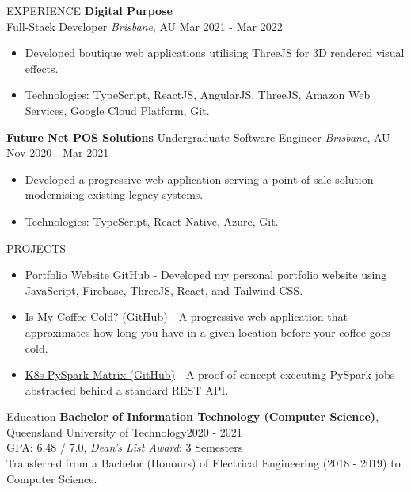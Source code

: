\documentclass{resume}
\begin{document}
\begin{rSection}{EXPERIENCE}
      \textbf{Digital Purpose}\\
      Full-Stack Developer \hfill \textit{Brisbane}, AU \textbar\space Mar 2021 - Mar 2022
      \begin{itemize}
         \item Developed boutique web applications utilising ThreeJS for 3D rendered visual effects.
         \item Technologies: TypeScript, ReactJS, AngularJS, ThreeJS, Amazon Web Services, Google Cloud Platform, Git.
      \end{itemize}
      
      \textbf{Future Net POS Solutions}
      Undergraduate Software Engineer \hfill \textit{Brisbane}, AU \textbar\space Nov 2020 - Mar 2021
      \begin{itemize}
         \item Developed a progressive web application serving a point-of-sale solution modernising existing legacy systems.
         \item Technologies: TypeScript, React-Native, Azure, Git.
      \end{itemize}
   \end{rSection} 

   \begin{rSection}{PROJECTS}
      \begin{itemize}
         \item \href{https://jim-t-kelly.web.app/}{Portfolio Website} \textbar\space \href{https://github.com/jamestkelly/personal-portfolio}{GitHub} - Developed my personal portfolio website using JavaScript, Firebase, ThreeJS, React, and Tailwind CSS.
         \item \href{https://github.com/jamestkelly/is-my-coffee-cold}{Is My Coffee Cold? (GitHub)} - A progressive-web-application that approximates how long you have in a given location before your coffee goes cold.
         \item \href{https://github.com/jamestkelly/K8s-PySpark-Matrix}{K8s PySpark Matrix (GitHub)} - A proof of concept executing PySpark jobs abstracted behind a standard REST API.
      \end{itemize}
   \end{rSection} 

   \begin{rSection}{Education}
      {\bf Bachelor of Information Technology (Computer Science)}, Queensland University of Technology\hfill {2020 - 2021}\\
      GPA: 6.48 / 7.0, \textit{Dean's List Award}: 3 Semesters\\
      Transferred from a Bachelor (Honours) of Electrical Engineering (2018 - 2019) to Computer Science.
   \end{rSection}
\end{document}
